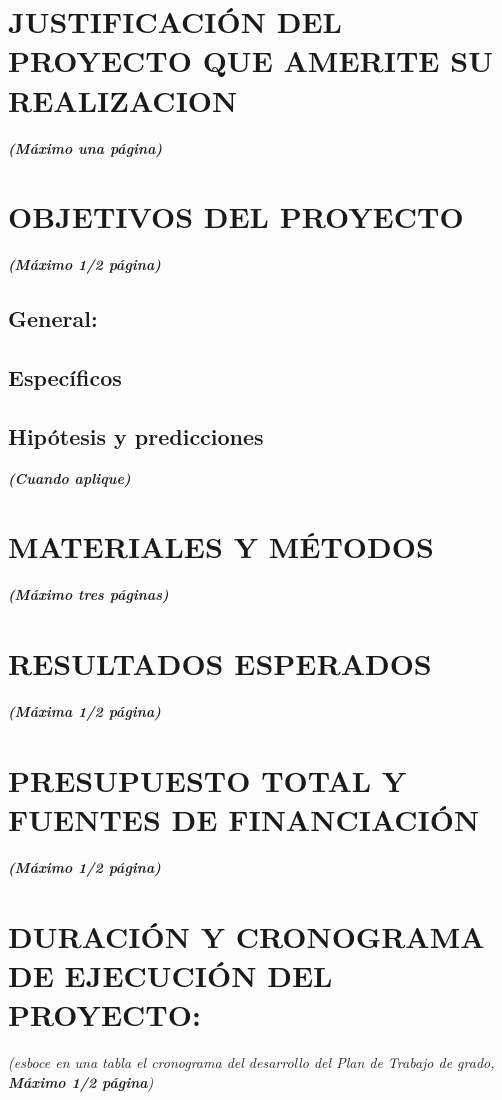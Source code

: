 \documentclass[12pt,letterpaper]{article}
\begin{document}
\section{JUSTIFICACIÓN DEL PROYECTO QUE AMERITE SU REALIZACION}
\emph{\textbf{(Máximo una página)}}\\

\section{OBJETIVOS DEL PROYECTO}
\emph{\textbf{(Máximo 1/2 página)}}
\subsection{General:}

\subsection{Específicos}

\subsection{Hipótesis y predicciones}
\emph{\textbf{(Cuando aplique)}}
\section{MATERIALES Y MÉTODOS}
\emph{\textbf{(Máximo tres páginas)}}




\section{RESULTADOS ESPERADOS}
\emph{\textbf{(Máxima 1/2 página)}}\\

\section{PRESUPUESTO TOTAL Y FUENTES DE FINANCIACIÓN}
\emph{\textbf{(Máximo 1/2 página)}}

\section{DURACIÓN Y CRONOGRAMA DE EJECUCIÓN DEL PROYECTO:}
\emph{(esboce en una tabla el cronograma del desarrollo del Plan de Trabajo de grado, \textbf{Máximo 1/2 página})}
\end{document}
